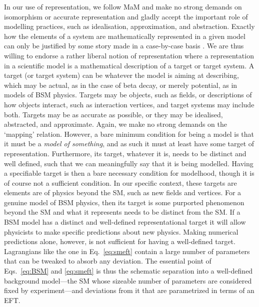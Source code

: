 In our use of representation, we follow MaM and make no strong demands on isomorphism or accurate representation and gladly accept the important role of modelling practices, such as idealisation, approximation, and abstraction. 
Exactly how the elements of a system are mathematically represented in a given model can only be justified by some story made in a case-by-case basis \citep[cf.~]{hartmann1999}. 
We are thus willing to endorse a rather liberal notion of representation where a representation in a scientific model is a mathematical description of a target or target system. 
A target (or target system) can be whatever the model is aiming at describing, which may be actual, as in the case of beta decay, or merely potential, as in models of BSM physics. 
Targets may be objects, such as fields, or descriptions of how objects interact, such as interaction vertices, and target systems may include both. 
Targets may be as accurate as possible, or they may be idealised, abstracted, and approximate. 
Again, we make no strong demands on the `mapping' relation. However, a bare minimum condition for being a model is that it must be a \textit{model of something}, and as such it must at least have some target of representation. 
Furthermore, its target, whatever it is, needs to be distinct and well defined, such that we can meaningfully say that it is being modelled.
Having a specifiable target is then a bare necessary condition for modelhood, though it is of course not a sufficient condition.
In our specific context, these targets are elements are of physics beyond the SM, such as new fields and vertices.
For a genuine model of BSM physics, then its target is some purported phenomenon beyond the SM and what it represents needs to be distinct from the SM. 
If a BSM model has a distinct and well-defined representational target it will allow physicists to make specific predictions about new physics.
Making numerical predictions alone, however, is not sufficient for having a well-defined target. 
Lagrangians like the one in Eq.~\ref{eq:smeft} contain a large number of parameters that can be tweaked to absorb any deviation. 
The essential point of Eqs.~\ref{eq:BSM} and \ref{eq:smeft} is thus the schematic separation into a well-defined background model---the SM whose sizeable number of parameters are considered fixed by experiment---and deviations from it that are parametrized in terms of an EFT.

